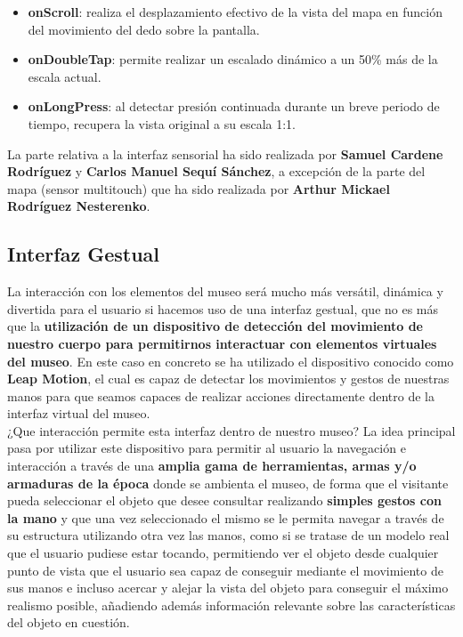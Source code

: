 \begin{enumerate}
\begin{itemize}
\begin{enumerate}
			\begin{itemize}
				\item \textbf{onScroll}: realiza el desplazamiento efectivo de la vista del mapa en función del movimiento del dedo sobre la pantalla.
				
				\item \textbf{onDoubleTap}: permite realizar un escalado dinámico a un 50\% más de la escala actual.
				
				\item \textbf{onLongPress}: al detectar presión continuada durante un breve periodo de tiempo, recupera la vista original a su escala 1:1.
			\end{itemize}

		\end{enumerate}
	\end{itemize}

	
	
	
	
\end{enumerate}


La parte relativa a la interfaz sensorial ha sido realizada por \textbf{Samuel Cardene Rodríguez} y \textbf{Carlos Manuel Sequí Sánchez}, a excepción de la parte del mapa (sensor multitouch) que ha sido realizada por \textbf{Arthur Mickael Rodríguez Nesterenko}.

\newpage 
\subsection{Interfaz Gestual}

La interacción con los elementos del museo será mucho más versátil, dinámica y divertida para el usuario si hacemos uso de una interfaz gestual, que no es más que la \textbf{utilización de un dispositivo de detección del movimiento de nuestro cuerpo para permitirnos interactuar con elementos virtuales del museo}. En este caso en concreto se ha utilizado el dispositivo conocido como \textbf{Leap Motion}, el cual es capaz de detectar los movimientos y gestos de nuestras manos para que seamos capaces de realizar acciones directamente dentro de la interfaz virtual del museo. 
\\

¿Que interacción permite esta interfaz dentro de nuestro museo? La idea principal pasa por utilizar este dispositivo para permitir al usuario la navegación e interacción a través de una \textbf{amplia gama de herramientas, armas y/o armaduras de la época} donde se ambienta el museo, de forma que el visitante pueda seleccionar el objeto que desee consultar realizando \textbf{simples gestos con la mano} y que una vez seleccionado el mismo se le permita navegar a través de su estructura utilizando otra vez las manos, como si se tratase de un modelo real que el usuario pudiese estar tocando, permitiendo ver el objeto desde cualquier punto de vista que el usuario sea capaz de conseguir mediante el movimiento de sus manos e incluso acercar y alejar la vista del objeto para conseguir el máximo realismo posible, añadiendo además información relevante sobre las características del objeto en cuestión.\\


